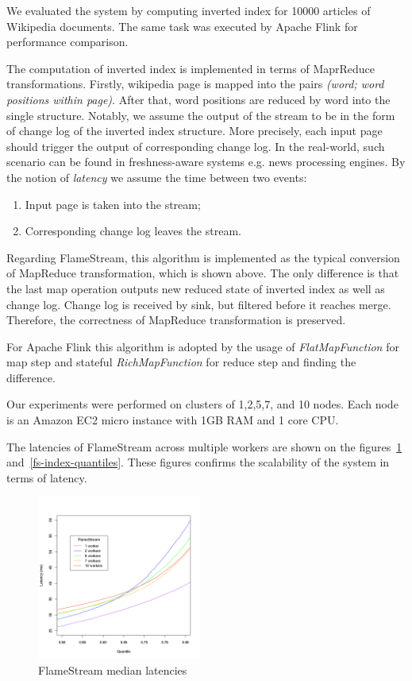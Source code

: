 
\label{fs-experiments-section}

We evaluated the system by computing inverted index for 10000 articles of Wikipedia documents. The same task was executed by Apache Flink for performance comparison.

The computation of inverted index is implemented in terms of MaprReduce transformations. Firstly, wikipedia page is mapped into the pairs {\it (word; word positions within page)}. After that, word positions are reduced by word into the single structure. Notably, we assume the output of the stream to be in the form of change log of the inverted index structure. More precisely, each input page should trigger the output of corresponding change log. In the real-world, such scenario can be found in freshness-aware systems e.g. news processing engines. By the notion of {\it latency} we assume the time between two events: 
\begin{enumerate}
    \item Input page is taken into the stream;
    \item Corresponding change log leaves the stream.
\end{enumerate}

Regarding FlameStream, this algorithm is implemented as the typical conversion of MapReduce transformation, which is shown above. The only difference is that the last map operation outputs new reduced state of inverted index as well as change log. Change log is received by sink, but filtered before it reaches merge. Therefore, the correctness of MapReduce transformation is preserved.

For Apache Flink this algorithm is adopted by the usage of {\it FlatMapFunction} for map step and stateful {\it RichMapFunction} for reduce step and finding the difference.

Our experiments were performed on clusters of 1,2,5,7, and 10 nodes. Each node is an Amazon EC2 micro instance with 1GB RAM and 1 core CPU.

The latencies of FlameStream across multiple workers are shown on the figures~\ref{fs-index-median} and~\ref{fs-index-quantiles}. These figures confirms the scalability of the system in terms of latency.

\begin{figure}[htbp]
  \centering
  \includegraphics[width=0.48\textwidth]{pics/fs-index-median}
  \caption{FlameStream median latencies}
  \label {fs-index-median}
\end{figure}

